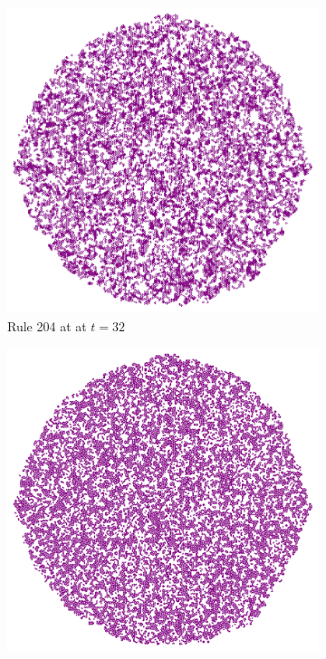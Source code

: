 \documentclass{article}
\begin{document}
\begin{figure}[H]
    \centering
    \begin{subfigure}[b]{0.8\textwidth}
        \centering
        \includegraphics[width=\textwidth]{graphics/behavior/textures/rule-204-time-32-noise.pdf}
        \caption{Rule 204 at at $t=32$}
        \label{fig:rule-204-time-32-noise}
    \end{subfigure}
    \vspace{20pt}
    \begin{subfigure}[b]{0.49\textwidth}
        \centering
        \includegraphics[width=\textwidth]{graphics/behavior/textures/rule-100-time-64-noise.pdf}

\end{subfigure}
\end{figure}
\end{document}
